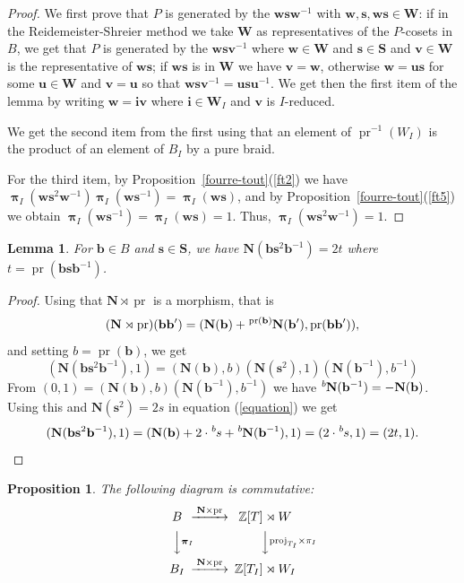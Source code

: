 \documentclass{amsart}
\numberwithin{equation}{section}
\newtheorem{lemma}[equation]{Lemma}
\newtheorem{proposition}[equation]{Proposition}
\newcommand\lexp[2]{\kern\scriptspace\vphantom{#2}^{#1}\kern-\scriptspace#2}
\newcommand\inv{^{-1}}
\newcommand\bb{{\mathbf b}}
\newcommand\bi{{\mathbf i}}
\newcommand\bs{{\mathbf s}}
\newcommand\bu{{\mathbf u}}
\newcommand\bv{{\mathbf v}}
\newcommand\bw{{\mathbf w}}
\newcommand\bN{{\mathbf N}}
\newcommand\bS{{\mathbf S}}
\newcommand\bW{{\mathbf W}}
\newcommand\BZ{{\mathbb Z}}
\DeclareMathOperator\pr{pr}
\DeclareMathOperator\bpi{\boldsymbol\pi}
\begin{document}
\begin{proof}
We first prove that $P$ is generated by the $\bw\bs\bw\inv$ with
$\bw,\bs,\bw\bs\in\bW$: if
in the Reidemeister-Shreier method we take $\bW$ as
representatives of the $P$-cosets in~$B$, we get that $P$ is generated by the
$\bw\bs\bv\inv$ where $\bw\in \bW$ and $\bs\in\bS$ and $\bv\in\bW$ is the representative of $\bw\bs$; if
$\bw\bs$ is in $\bW$ we have $\bv=\bw$, otherwise $\bw=\bu\bs$ for some
$\bu\in\bW$ and $\bv=\bu$ so that $\bw\bs\bv\inv=\bu\bs\bu\inv$. We get then
the first item of the lemma by writing
$\bw=\bi\bv$ where $\bi\in\bW_I$ and $\bv$ is $I$-reduced.

We get the second item from the first
using that an element of $\pr\inv(W_I)$ is the product of an element
of $B_I$ by a pure braid.

For the third item,
by Proposition~\ref{fourre-tout}(\ref{ft2})  we have 
$\bpi_I(\bw\bs^2\bw\inv)\bpi_I(\bw\bs\inv)=\bpi_I(\bw\bs)$, and  by 
Proposition~\ref{fourre-tout}(\ref{ft5}) we obtain $\bpi_I(\bw\bs\inv)=\bpi_I(\bw\bs)=1$. Thus, $\bpi_I(\bw\bs^2\bw\inv)=1$.
\end{proof}
\begin{lemma}\label{bsb}
For $\bb\in B$ and $\bs\in \bS$, we have $\bN(\bb\bs^2\bb\inv)=2t$ where
$t=\pr(\bb\bs\bb\inv)$.
\end{lemma}
\begin{proof}
Using that $\bN\rtimes \pr$ is a morphism, that is 
$$(\bN\rtimes\pr)(\bb\bb')=(\bN(\bb)+\lexp{\pr(\bb)}\bN(\bb'),\pr(\bb\bb')),$$
and setting $b=\pr(\bb)$, we get
\begin{equation}\label{equation}
(\bN(\bb\bs^2\bb\inv),1)=(\bN(\bb),b)(\bN(\bs^2),1)(\bN(\bb\inv),b\inv)
\end{equation}
 From $(0,1)=(\bN(\bb),b)(\bN(\bb\inv),b\inv)$ we have
 $\lexp{b}{\bN}(\bb\inv)=-\bN(\bb)$. Using this and $\bN(\bs^2)=2s$
in equation (\ref{equation}) we get 
 $$(\bN(\bb\bs^2\bb\inv),1)=(
\bN(\bb)+2\cdot\lexp{b}s+\lexp{b}{\bN}(\bb\inv),1)
=(2\cdot\lexp{b}s,1)=(2t,1).$$
\end{proof}
\begin{proposition}\label{commutative1}
The following diagram is commutative:
$$\begin{CD}
B@>\bN\times\pr>>\BZ[T]\rtimes W\\
 @VV\bpi_I V @VV {\mathrm{proj}}_{T_I}\times \pi_I V\\
B_I @>\bN\times \pr>> \BZ [T_I]\rtimes W_I
\end{CD}$$
\end{proposition}
\end{document}
